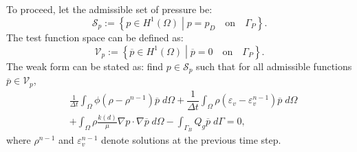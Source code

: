 To proceed, let the admissible set of pressure be:
\begin{equation*}
	\mathscr{S}_p := \left\{p \in H^1 (\Omega) \middle|
	p = p_D\quad\text{on}\quad\Gamma_P \right\}.
\end{equation*}
The test function space can be defined as:
\begin{equation*}
\mathscr{V}_{p}:= \left \{{\overline{p}}\in H^1(\Omega) \middle | {\overline{p}} =0 \quad \text{on} \quad \Gamma_P \right \}.
\end{equation*}
The weak form can be stated as: find $p\in\mathscr{S}_p$ such that for all admissible functions $\overline{p}\in\mathscr{V}_p$,
\begin{equation}\label{Eq:weak_pressure}
\begin{aligned}
        & \frac{1}{\Delta t} \int_{\Omega} {\phi}(\rho-\rho^{n-1}) {\overline{p}} \; d\Omega + \dfrac{1}{{\Delta t}}\int_{\Omega} \rho(\varepsilon_v-\varepsilon_v^{n-1}) {\overline{p}} \; d\Omega \\& +  \int_{\Omega} \rho \frac{k(d)}{\mu} \nabla p \cdot \nabla {\overline{p}} \; d\Omega   
                  -\int_{\Gamma_B} Q_g {\overline{p}} \; d\Gamma =0,
\end{aligned}
\end{equation}
where $\rho^{n-1}$ and $\varepsilon_v^{n-1}$ denote solutions at the previous time step.


